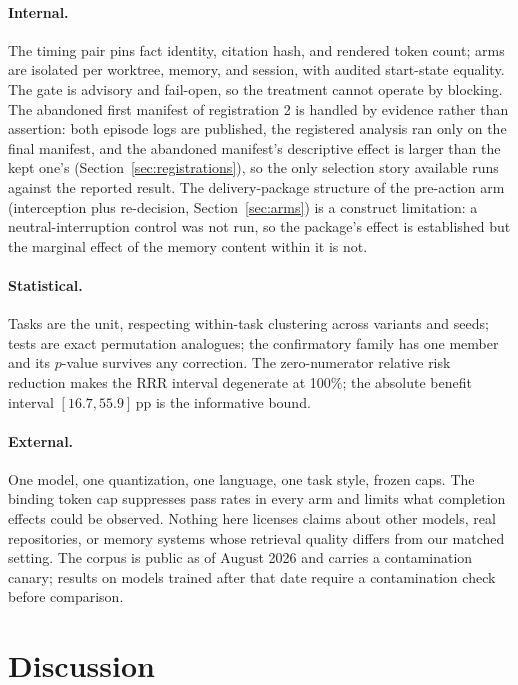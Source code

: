 \documentclass[11pt]{article}
\newcommand{\pp}{\ensuremath{\,\mathrm{pp}}}
\begin{document}
\paragraph{Internal.}
The timing pair pins fact identity, citation hash, and rendered token count;
arms are isolated per worktree, memory, and session, with audited start-state
equality. The gate is advisory and fail-open, so the treatment cannot operate
by blocking. The abandoned first manifest of registration 2 is handled by evidence
rather than assertion: both episode logs are published, the registered
analysis ran only on the final manifest, and the abandoned manifest's
descriptive effect is larger than the kept one's
(Section~\ref{sec:registrations}), so the only selection story available
runs against the reported result. The delivery-package structure of the
pre-action arm (interception plus re-decision, Section~\ref{sec:arms}) is a
construct limitation: a neutral-interruption control was not run, so the
package's effect is established but the marginal effect of the memory
content within it is not.

\paragraph{Statistical.}
Tasks are the unit, respecting within-task clustering across variants and
seeds; tests are exact permutation analogues; the confirmatory family has one
member and its $p$-value survives any correction. The zero-numerator relative
risk reduction makes the RRR interval degenerate at 100\%; the absolute
benefit interval $[16.7, 55.9]\pp$ is the informative bound.

\paragraph{External.}
One model, one quantization, one language, one task style, frozen caps. The
binding token cap suppresses pass rates in every arm and limits what
completion effects could be observed. Nothing here licenses claims about
other models, real repositories, or memory systems whose retrieval quality
differs from our matched setting. The corpus is public as of August 2026 and
carries a contamination canary; results on models trained after that date
require a contamination check before comparison.

\section{Discussion}
\label{sec:discussion}
\end{document}
